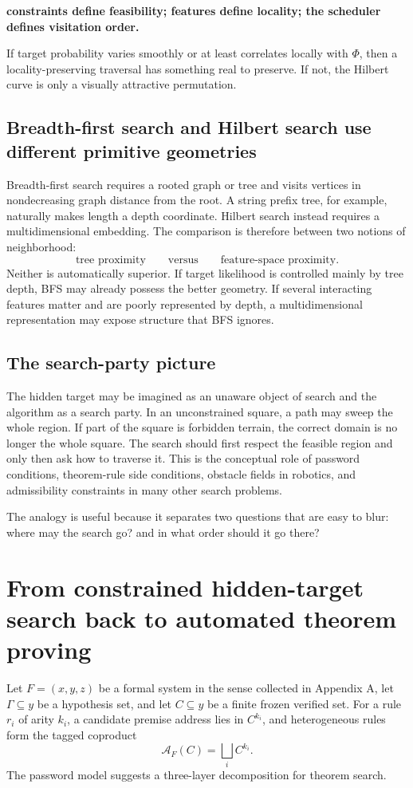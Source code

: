 \documentclass[11pt]{article}
\theoremstyle{hilberttheorem}
\begin{document}
\begin{center}\bfseries
constraints define feasibility; features define locality; the scheduler defines visitation order.
\end{center}

If target probability varies smoothly or at least correlates locally with $\Phi$, then a locality-preserving traversal has something real to preserve. If not, the Hilbert curve is only a visually attractive permutation.

\subsection{Breadth-first search and Hilbert search use different primitive geometries}\label{subsec:bfs-v-hilbert}
Breadth-first search requires a rooted graph or tree and visits vertices in nondecreasing graph distance from the root. A string prefix tree, for example, naturally makes length a depth coordinate. Hilbert search instead requires a multidimensional embedding. The comparison is therefore between two notions of neighborhood:
\[
\text{tree proximity}\qquad\text{versus}\qquad\text{feature-space proximity}.
\]
Neither is automatically superior. If target likelihood is controlled mainly by tree depth, BFS may already possess the better geometry. If several interacting features matter and are poorly represented by depth, a multidimensional representation may expose structure that BFS ignores.

\subsection{The search-party picture}\label{subsec:search-party}
The hidden target may be imagined as an unaware object of search and the algorithm as a search party. In an unconstrained square, a path may sweep the whole region. If part of the square is forbidden terrain, the correct domain is no longer the whole square. The search should first respect the feasible region and only then ask how to traverse it. This is the conceptual role of password conditions, theorem-rule side conditions, obstacle fields in robotics, and admissibility constraints in many other search problems.

The analogy is useful because it separates two questions that are easy to blur: where may the search go? and in what order should it go there?

\section{From constrained hidden-target search back to automated theorem proving}\label{sec:back-to-atp}
Let $F=(x,y,z)$ be a formal system in the sense collected in Appendix A, let $\Gamma\subseteq y$ be a hypothesis set, and let $C\subseteq y$ be a finite frozen verified set. For a rule $r_i$ of arity $k_i$, a candidate premise address lies in $C^{k_i}$, and heterogeneous rules form the tagged coproduct
\[
\mathcal A_F(C)=\bigsqcup_i C^{k_i}.
\]
The password model suggests a three-layer decomposition for theorem search.
\end{document}
